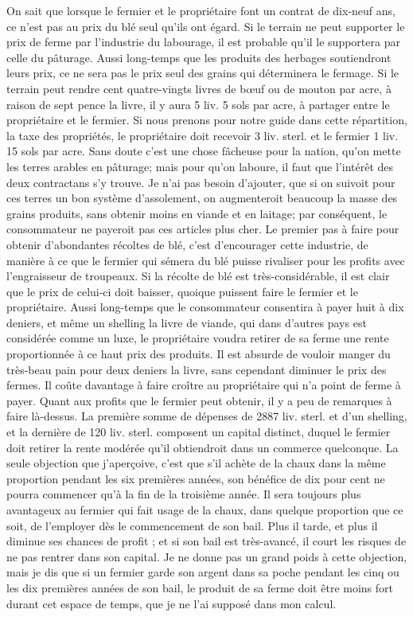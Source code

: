 On sait que lorsque le fermier et le propriétaire font un contrat de dix-neuf ans, ce n'est pas au prix du blé seul qu'ils ont égard. Si le terrain ne peut supporter le prix de ferme par l'industrie du labourage, il est probable qu'il le supportera par celle du pâturage. Aussi long-temps que les produits des herbages soutiendront leurs prix, ce ne sera pas le prix seul des grains qui déterminera le fermage. Si le terrain peut rendre cent quatre-vingts livres de bœuf ou de mouton par acre, à raison de sept pence la livre, il y aura 5 liv. 5 sols par acre, à partager entre le propriétaire et le fermier. Si nous prenons pour notre guide dans cette répartition, la taxe des propriétés, le propriétaire doit recevoir 3 liv. sterl. et le fermier 1 liv. 15 sols par acre. Sans doute c'est une chose fâcheuse pour la nation, qu'on mette les terres arables en pâturage; mais pour qu'on laboure, il faut que l'intérêt des deux contractans s'y trouve. Je n'ai pas besoin d'ajouter, que si on suivoit pour ces terres un bon système d'assolement, on augmenteroit\setcounter{page}{326} beaucoup la masse des grains produits, sans obtenir moins en viande et en laitage; par conséquent, le consommateur ne payeroit pas ces articles plus cher.
Le premier pas à faire pour obtenir d'abondantes récoltes de blé, c'est d'encourager cette industrie, de manière à ce que le fermier qui sémera du blé puisse rivaliser pour les profits avec l'engraisseur de troupeaux. Si la récolte de blé est très-considérable, il est clair que le prix de celui-ci doit baisser, quoique puissent faire le fermier et le propriétaire. Aussi long-temps que le consommateur consentira à payer huit à dix deniers, et même un shelling la livre de viande, qui dans d'autres pays est considérée comme un luxe, le propriétaire voudra retirer de sa ferme une rente proportionnée à ce haut prix des produits. Il est absurde de vouloir manger du très-beau pain pour deux deniers la livre, sans cependant diminuer le prix des fermes. Il coûte davantage à faire croître au propriétaire qui n'a point de ferme à payer.
Quant aux profits que le fermier peut obtenir, il y a peu de remarques à faire là-dessus. La première somme de dépenses de 2887 liv. sterl. et d'un shelling, et la\setcounter{page}{327} dernière de 120 liv. sterl. composent un capital distinct, duquel le fermier doit retirer la rente modérée qu'il obtiendroit dans un commerce quelconque. La seule objection que j'aperçoive, c'est que s'il achète de la chaux dans la même proportion pendant les six premières années, son bénéfice de dix pour cent ne pourra commencer qu'à la fin de la troisième année. Il sera toujours plus avantageux au fermier qui fait usage de la chaux, dans quelque proportion que ce soit, de l'employer dès le commencement de son bail. Plus il tarde, et plus il diminue ses chances de profit ; et si son bail est très-avancé, il court les risques de ne pas rentrer dans son capital. Je ne donne pas un grand poids à cette objection, mais je dis que si un fermier garde son argent dans sa poche pendant les cinq ou les dix premières années de son bail, le produit de sa ferme doit être moins fort durant cet espace de temps, que je ne l'ai supposé dans mon calcul.
